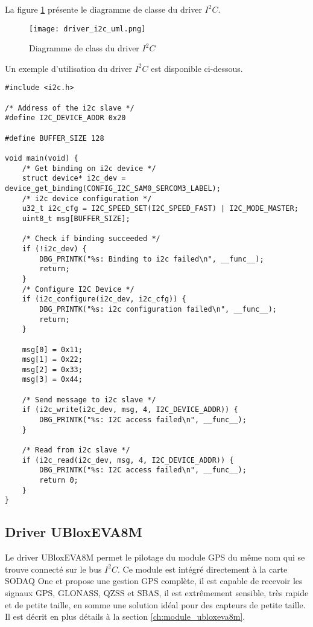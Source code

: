 La figure \ref{fig:driver_i2c_uml} présente le diagramme de classe du driver $I^{2}C$.

\begin{figure}[htb]
\centering 
\texttt{[image: driver\_i2c\_uml.png]} 
\caption{Diagramme de class du driver $I^{2}C$}
\label{fig:driver_i2c_uml}
\end{figure}

Un exemple d'utilisation du driver $I^{2}C$ est disponible ci-dessous.

\begin{lstlisting}[style=CStyle]
#include <i2c.h>

/* Address of the i2c slave */
#define I2C_DEVICE_ADDR 0x20

#define BUFFER_SIZE 128

void main(void) {
	/* Get binding on i2c device */
	struct device* i2c_dev = device_get_binding(CONFIG_I2C_SAM0_SERCOM3_LABEL);
	/* i2c device configuration */
	u32_t i2c_cfg = I2C_SPEED_SET(I2C_SPEED_FAST) | I2C_MODE_MASTER;
	uint8_t msg[BUFFER_SIZE];
	
	/* Check if binding succeeded */
	if (!i2c_dev) {
		DBG_PRINTK("%s: Binding to i2c failed\n", __func__);
		return;
	}
	/* Configure I2C Device */
	if (i2c_configure(i2c_dev, i2c_cfg)) {
		DBG_PRINTK("%s: i2c configuration failed\n", __func__);
		return;
	}	
	
	msg[0] = 0x11;
	msg[1] = 0x22;
	msg[2] = 0x33;
	msg[3] = 0x44;	
	
	/* Send message to i2c slave */
	if (i2c_write(i2c_dev, msg, 4, I2C_DEVICE_ADDR)) {
		DBG_PRINTK("%s: I2C access failed\n", __func__);
	}
	
	/* Read from i2c slave */
	if (i2c_read(i2c_dev, msg, 4, I2C_DEVICE_ADDR)) {
		DBG_PRINTK("%s: I2C access failed\n", __func__);
		return 0;
	}	
}
\end{lstlisting}

\subsection{Driver UBloxEVA8M}

Le driver UBloxEVA8M permet le pilotage du module GPS du même nom qui se trouve connecté sur le bus $I^{2}C$. Ce module est intégré directement à la carte SODAQ One et propose une gestion GPS complète, il est capable de recevoir les signaux GPS, GLONASS, QZSS et SBAS, il est extrêmement sensible, très rapide et de petite taille, en somme une solution idéal pour des capteurs de petite taille. Il est décrit en plus détails à la section \ref{ch:module_ubloxeva8m}. 

